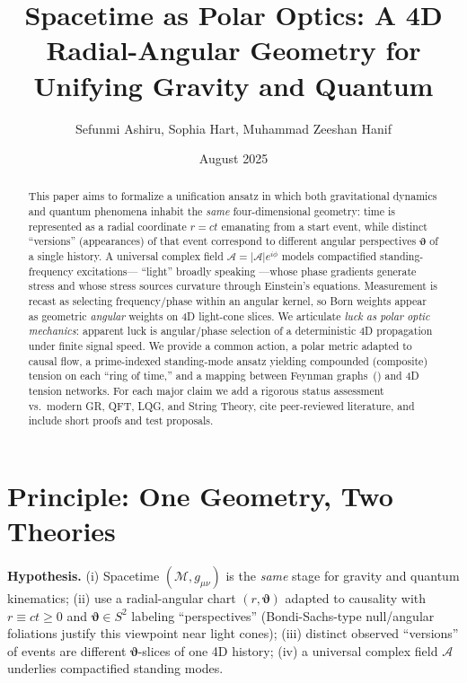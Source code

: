 \documentclass[reprint,amsmath,amssymb,aps,pra]{revtex4-2} %
\newcommand{\M}{\mathcal{M}}                   %
\newcommand{\g}{g}                             %
\newcommand{\A}{\mathcal{A}}                   %
\newcommand{\polangb}{\boldsymbol{\vartheta}}  %
\begin{document}
\title{Spacetime as Polar Optics: A 4D Radial-Angular Geometry for Unifying Gravity and Quantum}
\author{Sefunmi Ashiru, Sophia Hart, Muhammad Zeeshan Hanif}
\date{August 2025}

\begin{abstract}
This paper aims to formalize a unification ansatz in which both gravitational dynamics and quantum phenomena inhabit the \emph{same} four-dimensional geometry: time is represented as a radial coordinate $r=ct$ emanating from a start event, while distinct ``versions'' (appearances) of that event correspond to different angular perspectives $\polangb$ of a single history. A universal complex field $\A=|\A|e^{i\phi}$ models compactified standing-frequency excitations--- ``light'' broadly speaking ---whose phase gradients generate stress and whose stress sources curvature through Einstein's equations. Measurement is recast as selecting frequency/phase within an angular kernel, so Born weights appear as geometric \emph{angular} weights on 4D light-cone slices. We articulate \emph{luck as polar optic mechanics}: apparent luck is angular/phase selection of a deterministic 4D propagation under finite signal speed. We provide a common action, a polar metric adapted to causal flow, a prime-indexed standing-mode ansatz yielding compounded (composite) tension on each ``ring of time,'' and a mapping between Feynman graphs~(\cite{FeynmanHibbs1965}) and 4D tension networks. For each major claim we add a rigorous status assessment vs.~modern GR, QFT, LQG, and String Theory, cite peer-reviewed literature, and include short proofs and test proposals.
\end{abstract}

\maketitle

\section{Principle: One Geometry, Two Theories}
\textbf{Hypothesis.}
(i) Spacetime $(\M,\g_{\mu\nu})$ is the \emph{same} stage for gravity and quantum kinematics; (ii) use a radial-angular chart $(r,\polangb)$ adapted to causality with $r\equiv ct\ge 0$ and $\polangb\in S^2$ labeling ``perspectives'' (Bondi-Sachs-type null/angular foliations justify this viewpoint near light cones); (iii) distinct observed ``versions'' of events are different $\polangb$-slices of one 4D history; (iv) a universal complex field $\A$ underlies compactified standing modes.
\end{document}
